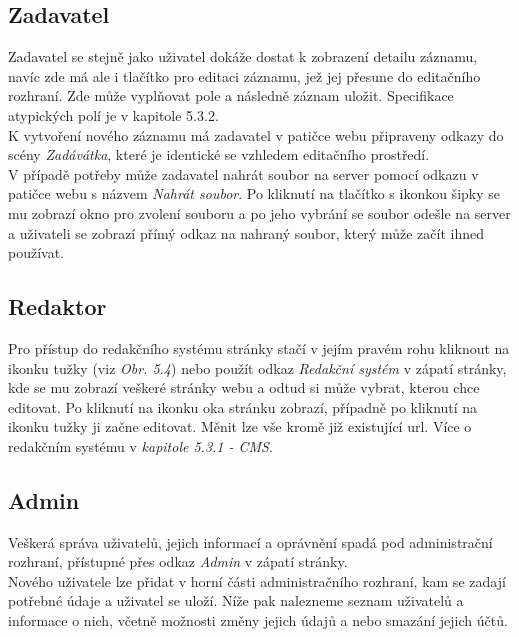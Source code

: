 \subsection{Zadavatel}
Zadavatel se stejně jako uživatel dokáže dostat k zobrazení detailu záznamu, navíc zde má
ale i tlačítko pro editaci záznamu, jež jej přesune do editačního rozhraní.
Zde může vyplňovat pole a následně záznam uložit. Specifikace atypických polí
je v kapitole 5.3.2.\\
K vytvoření nového záznamu má zadavatel v patičce webu připraveny odkazy do
scény \textit{Zadávátka}, které je identické se vzhledem editačního prostředí.\\
V případě potřeby může zadavatel nahrát soubor na server pomocí odkazu v
patičce webu s názvem \textit{Nahrát soubor}. Po kliknutí na tlačítko
s ikonkou šipky se mu zobrazí okno pro zvolení souboru a po jeho vybrání se
soubor odešle na server a uživateli se zobrazí přímý odkaz na nahraný soubor, který
může začít ihned používat.

\subsection{Redaktor}
Pro přístup do redakčního systému stránky stačí v jejím pravém rohu kliknout
na ikonku tužky (viz \textit{Obr. 5.4}) nebo použít odkaz \textit{Redakční systém}
v zápatí stránky, kde se mu zobrazí veškeré stránky webu a odtud si může vybrat,
kterou chce editovat. Po kliknutí na ikonku oka stránku zobrazí, případně po
kliknutí na ikonku tužky ji začne editovat. Měnit lze vše kromě již existující
url. Více o redakčním systému v \textit{kapitole 5.3.1 - CMS}.


\subsection{Admin}
Veškerá správa uživatelů, jejich informací a oprávnění spadá pod administrační rozhraní,
přístupné přes odkaz \textit{Admin} v zápatí stránky.\\
Nového uživatele lze přidat v horní části administračního rozhraní, kam se
zadají potřebné údaje a uživatel se uloží. Níže pak nalezneme seznam uživatelů a
informace o nich, včetně možnosti změny jejich údajů a nebo smazání jejich účtů.
